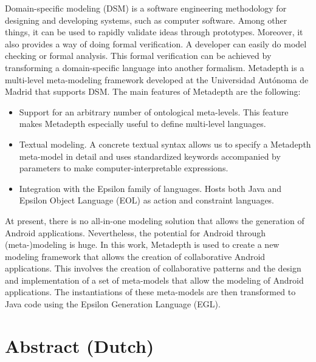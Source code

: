 Domain-specific modeling (DSM) is a software engineering methodology for designing and developing systems, such as computer software. Among other things, it can be used to rapidly validate ideas through prototypes. Moreover, it also provides a way of doing formal verification. A developer can easily do model checking or formal analysis. This formal verification can be achieved by transforming a domain-specific language into another formalism. Metadepth is a multi-level meta-modeling framework developed at the Universidad Aut\'onoma de Madrid that supports DSM. The main features of Metadepth are the following:
\begin{itemize}
\item{Support for an arbitrary number of ontological meta-levels. This feature makes Metadepth especially useful to define multi-level languages.}
\item{Textual modeling. A concrete textual syntax allows us to specify a Metadepth meta-model in detail and uses standardized keywords accompanied by parameters to make computer-interpretable expressions.}
\item{Integration with the Epsilon family of languages. Hosts both Java and Epsilon Object Language (EOL) as action and constraint languages.}
\end{itemize}
At present, there is no all-in-one modeling solution that allows the generation of Android applications. Nevertheless, the potential for Android through (meta-)modeling is huge. In this work, Metadepth is used to create a new modeling framework that allows the creation of collaborative Android applications. This involves the creation of collaborative patterns and the design and implementation of a set of meta-models that allow the modeling of Android applications. The instantiations of these meta-models are then transformed to Java code using the Epsilon Generation Language (EGL). 

\chapter*{Abstract (Dutch)}

